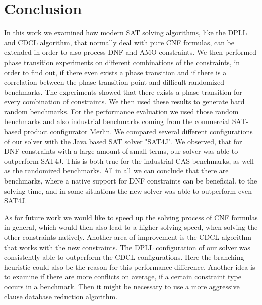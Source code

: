 \documentclass{easychair}
\begin{document}
\section{Conclusion}
In this work we examined how modern SAT solving algorithms, like the DPLL and CDCL algorithm, that normally deal with pure CNF formulas, can be extended in order to also process DNF and AMO constraints. 
We then performed phase transition experiments on different combinations of the constraints, in order to find out, if there even exists a phase transition and if there is a correlation between the phase transition point and difficult randomized benchmarks. The experiments showed that there exists a phase transition for every combination of constraints. We then used these results to generate hard random benchmarks. For the performance evaluation  we used those random benchmarks and also industrial benchmarks coming from the commercial SAT-based product configurator Merlin. We compared several different configurations of our solver with the Java based SAT solver "SAT4J".
We observed, that for DNF constraints with a large amount of small terms, our solver was able to outperform SAT4J. This is both true for the industrial CAS benchmarks, as well as the randomized benchmarks. 
All in all we can conclude that there are benchmarks, where a native support for DNF constraints can be beneficial. to the solving time, and in some situations the new solver was able to outperform even SAT4J.

As for future work we would like to speed up the solving process of CNF formulas in general, which would then also lead to a higher solving speed, when solving the other constraints natively.
Another area of improvement is the CDCL algorithm that works with the new constraints. The DPLL configuration of our solver was consistently able to outperform the CDCL configurations. Here the branching heuristic could also be the reason for this performance difference. Another idea is to examine if there are more conflicts on average, if a certain constraint type occurs in a benchmark. Then it might be necessary to use a more aggressive clause database reduction algorithm.

\label{sect:bib}

%
%
%

\end{document}
